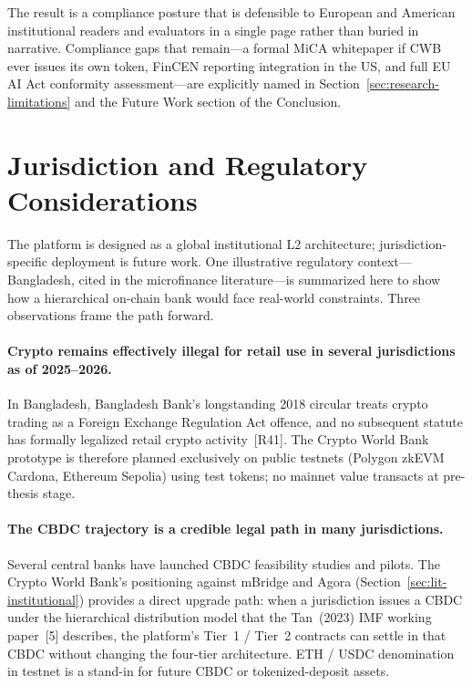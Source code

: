 \documentclass[12pt,a4paper]{report}
\begin{document}
The result is a compliance posture that is defensible to European and American institutional readers and evaluators in a single page rather than buried in narrative. Compliance gaps that remain---a formal MiCA whitepaper if CWB ever issues its own token, FinCEN reporting integration in the US, and full EU AI Act conformity assessment---are explicitly named in Section~\ref{sec:research-limitations} and the Future Work section of the Conclusion.

\section{Jurisdiction and Regulatory Considerations}
\label{sec:bangladesh-reg}

The platform is designed as a global institutional L2 architecture; jurisdiction-specific deployment is future work. One illustrative regulatory context---Bangladesh, cited in the microfinance literature---is summarized here to show how a hierarchical on-chain bank would face real-world constraints. Three observations frame the path forward.

\paragraph{Crypto remains effectively illegal for retail use in several jurisdictions as of 2025--2026.}
In Bangladesh, Bangladesh Bank's longstanding 2018 circular treats crypto trading as a Foreign Exchange Regulation Act offence, and no subsequent statute has formally legalized retail crypto activity~[R41]. The Crypto World Bank prototype is therefore planned exclusively on public testnets (Polygon zkEVM Cardona, Ethereum Sepolia) using test tokens; no mainnet value transacts at pre-thesis stage.

\paragraph{The CBDC trajectory is a credible legal path in many jurisdictions.}
Several central banks have launched CBDC feasibility studies and pilots. The Crypto World Bank's positioning against mBridge and Agora (Section~\ref{sec:lit-institutional}) provides a direct upgrade path: when a jurisdiction issues a CBDC under the hierarchical distribution model that the Tan~(2023) IMF working paper~[5] describes, the platform's Tier~1 / Tier~2 contracts can settle in that CBDC without changing the four-tier architecture. ETH / USDC denomination in testnet is a stand-in for future CBDC or tokenized-deposit assets.
\end{document}
